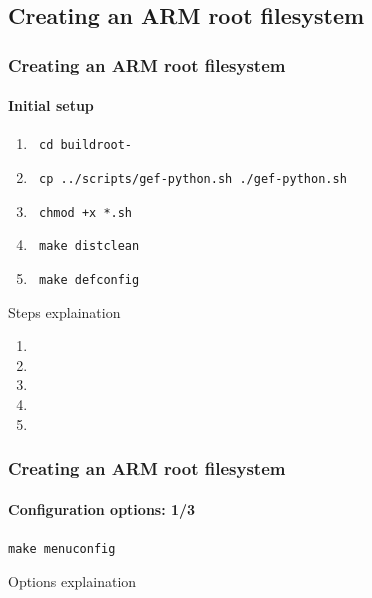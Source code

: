\subsection{Creating an ARM root filesystem}
\begin{frame}
  \frametitle{Creating an ARM root filesystem}
  \framesubtitle{Initial setup}

  \begin{enumerate}
    \item \texttt{ cd buildroot-\buildrootLatestVersion }
    \item \texttt{ cp ../scripts/gef-python.sh ./gef-python.sh }
    \item \texttt{ chmod +x *.sh }
    \item \texttt{ make distclean }
    \item \texttt{ make defconfig }
  \end{enumerate}

\end{frame}
 {
  Steps explaination
  \begin{enumerate}
    \item \enteringBuildRootDirectoryDescription
    \item \gefPythonDescription
    \item \scriptShouldBeExecutableDescription
    \item \makeCleanDescription
    \item \makeDefConfigDescription
  \end{enumerate}
}

\begin{frame}
  \frametitle{Creating an ARM root filesystem}
  \framesubtitle{Configuration options: 1/3}
  \texttt{make menuconfig}
  \begin{itemize}
    \targetOptionsList
    \buildOptionsList
  \end{itemize}
\end{frame}
 {
  Options explaination \\
  \targetOptionsDescription \\
  \buildOptionsDescription
}

